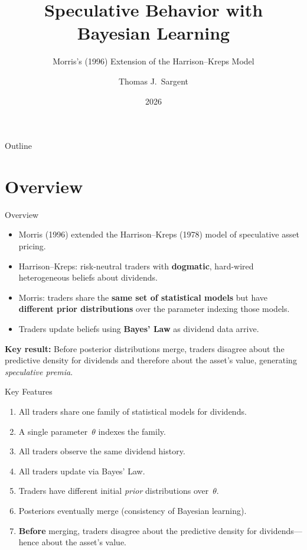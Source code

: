 \documentclass[11pt,aspectratio=169]{beamer}
\title{Speculative Behavior with Bayesian Learning}
\subtitle{Morris's (1996) Extension of the Harrison--Kreps Model}
\author{Thomas J.\ Sargent}
\date{2026}
\begin{document}
\begin{frame}
\titlepage
\end{frame}

\begin{frame}{Outline}
\tableofcontents
\end{frame}

\section{Overview}

\begin{frame}{Overview}

\begin{itemize}
\item Morris (1996) extended the Harrison--Kreps (1978) model of
      speculative asset pricing.

\item Harrison--Kreps: risk-neutral traders with \textbf{dogmatic},
      hard-wired heterogeneous beliefs about dividends.

\item Morris: traders share the \textbf{same set of statistical
      models} but have \textbf{different prior distributions}
      over the parameter indexing those models.

\item Traders update beliefs using \textbf{Bayes' Law} as dividend
      data arrive.
\end{itemize}

\medskip
\textbf{Key result:} Before posterior distributions merge, traders
disagree about the predictive density for dividends and therefore
about the asset's value,  generating \emph{speculative premia}.

\end{frame}

\begin{frame}{Key Features}

\begin{enumerate}
\item All traders share one family of statistical models for dividends.
\item A single parameter~$\theta$ indexes the family.
\item All traders observe the same dividend history.
\item All traders update via Bayes' Law.
\item Traders have different initial \emph{prior} distributions over~$\theta$.
\item Posteriors eventually merge (consistency of Bayesian learning).
\item \textbf{Before} merging, traders disagree about the
      predictive density for dividends---hence about the asset's value.
\end{enumerate}

\end{frame}
\end{document}
